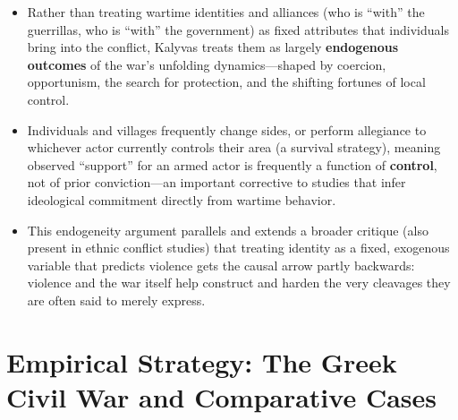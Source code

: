 \documentclass[12pt]{article}
\begin{document}
\begin{itemize}[leftmargin=*, itemsep=4pt]
    \item Rather than treating wartime identities and alliances (who is ``with'' the guerrillas, who is ``with'' the government) as fixed attributes that individuals bring into the conflict, Kalyvas treats them as largely \textbf{endogenous outcomes} of the war's unfolding dynamics---shaped by coercion, opportunism, the search for protection, and the shifting fortunes of local control.
    \item Individuals and villages frequently change sides, or perform allegiance to whichever actor currently controls their area (a survival strategy), meaning observed ``support'' for an armed actor is frequently a function of \textbf{control}, not of prior conviction---an important corrective to studies that infer ideological commitment directly from wartime behavior.
    \item This endogeneity argument parallels and extends a broader critique (also present in ethnic conflict studies) that treating identity as a fixed, exogenous variable that predicts violence gets the causal arrow partly backwards: violence and the war itself help construct and harden the very cleavages they are often said to merely express.
\end{itemize}

\section{Empirical Strategy: The Greek Civil War and Comparative Cases}
\end{document}
